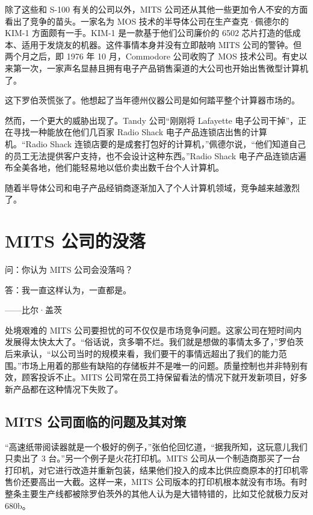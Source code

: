 \documentclass[12pt,UTF8]{ctexbook}
\begin{document}
除了这些和 S-100 有关的公司以外，MITS 公司还从其他一些更加令人不安的方面看出了竞争的苗头。一家名为 MOS 技术的半导体公司在生产查克·佩德尔的 KIM-1 方面颇有一手。KIM-1 是一款基于他们公司廉价的 6502 芯片打造的低成本、适用于发烧友的机器。这件事情本身并没有立即敲响 MITS 公司的警钟。但两个月之后，即 1976 年 10 月，Commodore 公司收购了 MOS 技术公司。有史以来第一次，一家声名显赫且拥有电子产品销售渠道的大公司也开始出售微型计算机了。

这下罗伯茨慌张了。他想起了当年德州仪器公司是如何踏平整个计算器市场的。

然而，一个更大的威胁出现了。Tandy 公司“刚刚将 Lafayette 电子公司干掉”，正在寻找一种能放在他们几百家 Radio Shack 电子产品连锁店出售的计算机。“Radio Shack 连锁店要的是成套打包好的计算机，”佩德尔说，“他们知道自己的员工无法提供客户支持，也不会设计这种东西。”Radio Shack 电子产品连锁店遍布全美各地，他们能轻易地以低价卖出数千台个人计算机。

随着半导体公司和电子产品经销商逐渐加入了个人计算机领域，竞争越来越激烈了。





\section{MITS 公司的没落}


问：你认为 MITS 公司会没落吗？

答：我一直这样认为，一直都是。

——比尔·盖茨



处境艰难的 MITS 公司要担忧的可不仅仅是市场竞争问题。这家公司在短时间内发展得太快太大了。“俗话说，贪多嚼不烂。我们就是想做的事情太多了，”罗伯茨后来承认，“以公司当时的规模来看，我们要干的事情远超出了我们的能力范围。”市场上用着的那些有缺陷的存储板并不是唯一的问题。质量控制也并非特别有效，顾客投诉不止。MITS 公司常在员工持保留看法的情况下就开发新项目，好多新产品都在这种情况下失败了。





\subsection{MITS 公司面临的问题及其对策}


“高速纸带阅读器就是一个极好的例子，”张伯伦回忆道，“据我所知，这玩意儿我们只卖出了 3 台。”另一个例子是火花打印机。MITS 公司从一个制造商那买了一台打印机，对它进行改造并重新包装，结果他们投入的成本比供应商原本的打印机零售价还要高出一大截。这样一来，MITS 公司版本的打印机根本就没有市场。有时整条主要生产线都被除罗伯茨外的其他人认为是大错特错的，比如艾伦就极力反对 680b。
\end{document}
